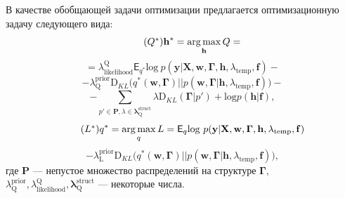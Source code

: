 В качестве обобщающей задачи оптимизации предлагается оптимизационную задачу следующего вида:
\begin{equation}
\tag{$Q^{*}$}
\label{eq:qopt}
\mathbf{h}^{*} = \argmax_{\mathbf{h}} Q = 
\end{equation}
\[
= {\lambda_\text{likelihood}^\text{Q}\mathsf{E}_{{q}^{*}} \text{log}~{p(\mathbf{y} | \mathbf{X}, \mathbf{w},\boldsymbol{\Gamma}, \mathbf{h}, \lambda_\text{temp}, \mathbf{f})}}
 -\]
\vspace{-0.3cm}
\[- {\lambda^\text{prior}_\text{Q}\text{D}_{KL}\bigl( q^{*}(\mathbf{w}, \boldsymbol{\Gamma}) || p(\mathbf{w}, \boldsymbol{\Gamma} |\mathbf{h}, \lambda_{\text{temp}},\mathbf{f}) \bigr)}  -\]
\vspace{-0.3cm}
\[
-{\sum_{p' \in \mathbf{P}, \lambda \in \boldsymbol{\lambda}^\text{struct}_\text{Q}} \lambda\text{D}_{KL}(\boldsymbol{\Gamma} | p')+\text{log}p(\mathbf{h}|\mathbf{f})}, 
\]
\begin{equation}
\tag{$L^{*}$}
{q}^{*} = \argmax_{q} L = 
{\mathsf{E}_q \text{log}~{p(\mathbf{y} | \mathbf{X}, \mathbf{w}, \boldsymbol{\Gamma}, \mathbf{h}, \lambda_{\text{temp}}, \mathbf{f})}}
\end{equation}
\vspace{-0.3cm}
\[- {\lambda^\text{prior}_\text{L}\text{D}_{KL}\bigl( q^{*}(\mathbf{w}, \boldsymbol{\Gamma}) || p(\mathbf{w}, \boldsymbol{\Gamma} |\mathbf{h}, \lambda_{\text{temp}},\mathbf{f}) \bigr)},
\]
где $\mathbf{P}$ --- непустое множество распределений на структуре $\boldsymbol{\Gamma}$, $\lambda^\text{prior}_\text{Q}, \lambda_\text{likelihood}^\text{Q}, \boldsymbol{\lambda}^\text{struct}_\text{Q}$ --- некоторые числа.

